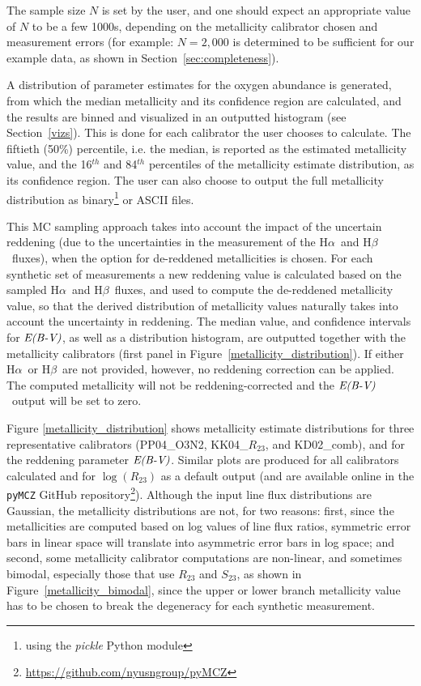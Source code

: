 \documentclass{emulateapj} \usepackage{amsmath} \usepackage{float}
\newcommand{\ha}{\ensuremath{\mathrm{H}\alpha}}
\newcommand{\hb}{\ensuremath{\mathrm{H}\beta}}
\newcommand{\ebmv}{\ensuremath{\mathrm{\emph{E(B-V)}}}}
\begin{document}
The sample size $N$ is set by the user, and one should expect an
appropriate value of $N$ to be a few 1000s, depending on the
metallicity calibrator chosen and measurement errors (for example:
$N=2,000$ is determined to be sufficient for our example data, as
shown in Section~\ref{sec:completeness}).

A distribution of parameter estimates for the oxygen abundance is
generated, from which the median metallicity and its confidence region
are calculated, and the results are binned and visualized in an
outputted histogram (see Section~\ref{vizs}). This is done for each
calibrator the user chooses to calculate. The fiftieth (50\%)
percentile, i.e.  the median, is reported as the estimated metallicity
value, and the 16$^{th}$ and 84$^{th}$ percentiles of the metallicity
estimate distribution, as its confidence region. The user can also
choose to output the full metallicity distribution as
binary\footnote{using the \emph{pickle} Python module} or ASCII files.

This MC sampling approach takes into account the impact of the
uncertain reddening (due to the uncertainties in the measurement of
the \ha~and \hb~fluxes), when the option for de-reddened metallicities
is chosen. For each synthetic set of measurements a new reddening
value is calculated based on the sampled \ha~and \hb~fluxes, and used
to compute the de-reddened metallicity value, so that the derived
distribution of metallicity values naturally takes into account the
uncertainty in reddening. The median value, and confidence intervals
for \ebmv, as well as a distribution histogram, are outputted together
with the metallicity calibrators (first panel in
Figure~\ref{metallicity_distribution}). If either \ha~or \hb~are not
provided, however, no reddening correction can be applied. The
computed metallicity will not be reddening-corrected and the
\ebmv~output will be set to zero.

Figure \ref{metallicity_distribution} shows metallicity estimate
distributions for three representative calibrators (PP04\_O3N2,
KK04\_$R_{23}$, and KD02\_comb), and for the reddening parameter
\ebmv. Similar plots are produced for all calibrators calculated and
for $\log(R_{23})$ as a default output (and are available online in the \verb=pyMCZ= GitHub repository\footnote{\url{https://github.com/nyusngroup/pyMCZ}}). Although the input line flux
distributions are Gaussian, the metallicity distributions are not, for
two reasons: first, since the metallicities are computed based on log
values of line flux ratios, symmetric error bars in linear space will
translate into asymmetric error bars in log space; and second, some
metallicity calibrator computations are non-linear, and sometimes
bimodal, especially those that use $R_{23}$ and $S_{23}$, as shown in
Figure~\ref{metallicity_bimodal}, since the upper or lower branch
metallicity value has to be chosen to break the degeneracy for each
synthetic measurement.
\end{document}
